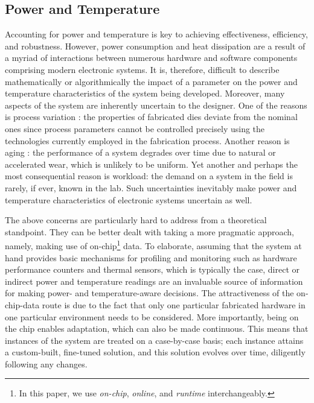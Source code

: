 \subsection{Power and Temperature}
Accounting for power and temperature is key to achieving effectiveness,
efficiency, and robustness. However, power consumption and heat dissipation are
a result of a myriad of interactions between numerous hardware and software
components comprising modern electronic systems. It is, therefore, difficult to
describe mathematically or algorithmically the impact of a parameter on the
power and temperature characteristics of the system being developed. Moreover,
many aspects of the system are inherently uncertain to the designer. One of the
reasons is process variation \cite{chandrakasan2000}: the properties of
fabricated dies deviate from the nominal ones since process parameters cannot be
controlled precisely using the technologies currently employed in the
fabrication process. Another reason is aging \cite{coskun2006}: the performance
of a system degrades over time due to natural or accelerated wear, which is
unlikely to be uniform. Yet another and perhaps the most consequential reason is
workload: the demand on a system in the field is rarely, if ever, known in the
lab. Such uncertainties inevitably make power and temperature characteristics of
electronic systems uncertain as well.

The above concerns are particularly hard to address from a theoretical
standpoint. They can be better dealt with taking a more pragmatic approach,
namely, making use of on-chip\footnote{In this paper, we use \emph{on-chip},
\emph{online}, and \emph{runtime} interchangeably.} data. To elaborate, assuming
that the system at hand provides basic mechanisms for profiling and monitoring
such as hardware performance counters and thermal sensors, which is typically
the case, direct or indirect power and temperature readings are an invaluable
source of information for making power- and temperature-aware decisions. The
attractiveness of the on-chip-data route is due to the fact that only one
particular fabricated hardware in one particular environment needs to be
considered. More importantly, being on the chip enables adaptation, which can
also be made continuous. This means that instances of the system are treated on
a case-by-case basis; each instance attains a custom-built, fine-tuned solution,
and this solution evolves over time, diligently following any changes.

